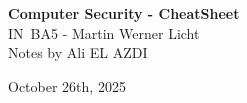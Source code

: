 \documentclass[8pt]{article}
\begin{document}
\begin{titlepage}
	\centering
	\vspace*{1cm}
	{\Huge \textbf{Computer Security - CheatSheet}} \\
	\vspace{20px}
	{\LARGE IN~BA5 - Martin Werner Licht} \\
	\vspace*{1cm}
	{\Large Notes by Ali EL AZDI} \\
	\vfill

	\begin{justify}

	\end{justify}
	\vspace*{100px}

	{\large October 26th, 2025}
	\vspace*{20px}
\end{titlepage}
\end{document}
